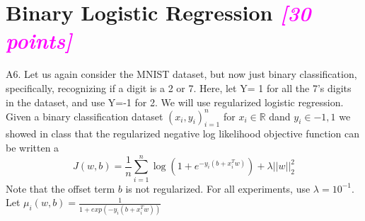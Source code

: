 \documentclass{article}
\newcommand{\field}[1]{\mathbb{#1}}
\newcommand{\1}{\mathbf{1}}
\newcommand{\R}{\field{R}} %
\newcommand{\points}[1]{\small\textcolor{magenta}{\emph{[#1 points]}} \normalsize}
\begin{document}
\newpage
\section*{Binary Logistic Regression \points{30}}
A6. Let us again consider the MNIST dataset, but now just binary classification, specifically, recognizing if a digit is a 2 or 7. Here, let Y= 1 for all the 7’s digits in the dataset, and use Y=-1 for 2. We will use regularized logistic regression.  Given a binary classification dataset ${(x_i,y_i)}^n_{i=1}$ for $x_i\in\R$ dand $y_i\in {-1,1}$ we showed in class that the regularized negative log likelihood objective function can be written a
$$J(w,b) = \frac{1}{n} \sum_{i=1}^n \log{\left( 1 + e^{-y_i(b+x^T_iw)} \right)} + \lambda||w||^2_2$$
Note that the offset term $b$ is not regularized. For all experiments, use $\lambda = 10^{-1}$. Let $\mu_i(w,b) = \frac{1}{1+exp(-y_i(b+x^T_iw))}$
\end{document}
